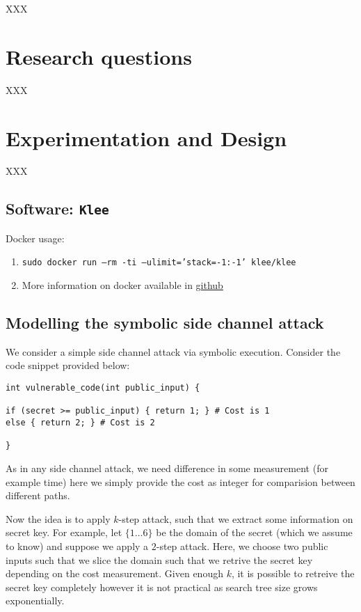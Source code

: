 \documentclass[11pt,a4paper,notitlepage]{article}
\begin{document}
XXX

\newpage

\section{Research questions}
\label{sec:researchquestions}

XXX

\newpage

\section{Experimentation and Design}
\label{sec:experimentationanddesign}

XXX

\subsection{Software: \texttt{Klee}}
\label{subsec:softwares}

Docker usage:
\begin{enumerate}
    \item \texttt{sudo docker run --rm -ti --ulimit='stack=-1:-1' klee/klee}
    \item More information on docker available in \href{http://klee.github.io/releases/docs/v1.3.0/docker/}{github}
\end{enumerate}

\subsection{Modelling the symbolic side channel attack}
\label{subsec:modellingsscattack}

We consider a simple side channel attack via symbolic execution.
Consider the code snippet provided below:
\begin{verbatim}
int vulnerable_code(int public_input) {

if (secret >= public_input) { return 1; } # Cost is 1
else { return 2; } # Cost is 2

}
\end{verbatim}

As in any side channel attack, we need difference in some measurement (for example time) here we simply provide the cost as integer
for comparision between different paths.

Now the idea is to apply $k$-step attack, such that we extract some information on secret key.
For example, let $\{1 \dots 6\}$ be the domain of the secret (which we assume to know) and suppose we apply a $2$-step attack.
Here, we choose two public inputs such that we slice the domain such that we retrive the secret key depending on the cost measurement.
Given enough $k$, it is possible to retreive the secret key completely however it is not practical as search tree size grows exponentially.
\end{document}

